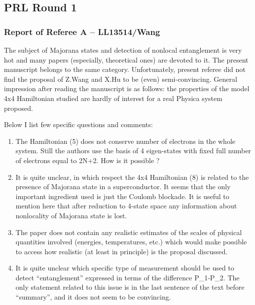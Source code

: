 \documentclass[11pt]{article}
\begin{document}
\hypertarget{prl-round-1}{%
\subsection{PRL Round 1}\label{prl-round-1}}

\hypertarget{report-of-referee-a-ll13514wang}{%
\subsubsection{Report of Referee A --
LL13514/Wang}\label{report-of-referee-a-ll13514wang}}

The subject of Majorana states and detection of nonlocal entanglement is
very hot and many papers (especially, theoretical ones) are devoted to
it. The present manuscript belongs to the same category. Unfortunately,
present referee did not find the proposal of Z.Wang and X.Hu to be
(even) semi-convincing. General impression after reading the manuscript
is as follows: the properties of the model 4x4 Hamiltonian studied are
hardly of interest for a real Physica system proposed.

Below I list few specific questions and comments:

\begin{enumerate}
\def\labelenumi{\arabic{enumi}.}
\item
  The Hamiltonian (5) does not conserve number of electrons in the whole
  system. Still the authors use the basis of 4 eigen-states with fixed
  full number of electrons equal to 2N+2. How is it possible ?
\item
  It is quite unclear, in which respect the 4x4 Hamiltonian (8) is
  related to the presence of Majorana state in a superconductor. It
  seems that the only important ingredient used is just the Coulomb
  blockade. It is useful to mention here that after reduction to 4-state
  space any information about nonlocality of Majorana state is lost.
\item
  The paper does not contain any realistic estimates of the scales of
  physical quantities involved (energies, temperatures, etc.) which
  would make possible to access how realistic (at least in principle) is
  the proposal discussed.
\item
  It is quite unclear which specific type of measurement should be used
  to detect ``entanglement'' expressed in terms of the difference
  P\_1-P\_2. The only statement related to this issue is in the last
  sentence of the text before ``summary'', and it does not seem to be
  convincing.
\end{enumerate}
\end{document}
